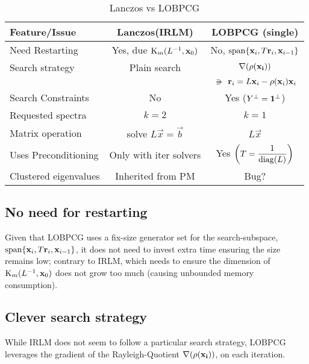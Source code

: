 \begin{table}[h]  
  \caption{Lanczos vs LOBPCG}\label{tab:lanczos-vs-lobpcg}
  \begin{tabular}{l | c | c | }
    Feature/Issue & Lanczos(IRLM) & LOBPCG (single) \\
    \hline \hline
    Need Restarting &
    Yes, due $\Krylov{\inv{L}}{\vec{x}_0}{m}$ &
    No, $\func{span} \{\vec{x}_i, T\vec{r}_i, \vec{x}_{i-1}\}$ \\
    \hline
    Search strategy &
    Plain search &
    $\nabla (\func{\rho}(\vec{x_i}))$ \\
    &
    &
    $\suchthat \vec{r}_i = L\vec{x}_i - \func{\rho}(\vec{x}_i)\vec{x}_i$\\
    \hline
    Search Constraints &
    No &
    Yes ($\ortc{Y} = \ortc{\vec{1}}$) \\
    \hline
    Requested spectra &
    $k=2$ &
    $k=1$ \\      
    \hline
    Matrix operation &
    solve $L\vec{x} = \vec{b}$ &
    $L\vec{x}$ \\
    \hline      
    Uses Preconditioning &
    Only with iter solvers &
    Yes $\left(T = \dfrac{1}{\func{diag}(L)} \right)$ \\
    \hline
    Clustered eigenvalues &
    Inherited from PM &
    Bug? \\      
    \hline
  \end{tabular}
\end{table}

\subsection{No need for restarting}

Given that \gls{LOBPCG} uses a fix-size generator set for the
search-subspace, $\func{span} \{\vec{x}_i, T\vec{r}_i,
\vec{x}_{i-1}\}$, it does not need to invest extra time ensuring the
size remains low; contrary to \gls{IRLM}, which needs to
ensure the dimension of $\Krylov{\inv{L}}{\vec{x}_0}{m}$ does not grow
too much (causing unbounded memory consumption).

\subsection{Clever search strategy}

While \gls{IRLM} does not seem to follow a particular search strategy,
\gls{LOBPCG} leverages the gradient of the Rayleigh-Quotient $\nabla
(\func{\rho}(\vec{x_i}))$, on each iteration.

